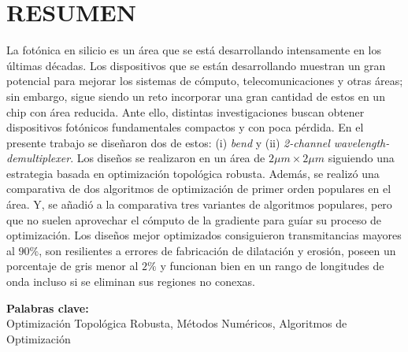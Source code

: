 \chapter*{\center \Large \vspace{-4.5cm} RESUMEN}

La fotónica en silicio es un área que se está desarrollando intensamente en los últimas décadas.
Los dispositivos que se están desarrollando muestran un gran potencial para mejorar
los sistemas de cómputo, telecomunicaciones y otras áreas;
sin embargo, sigue siendo un reto incorporar una gran cantidad de estos en un chip con área reducida.
Ante ello, distintas investigaciones buscan obtener dispositivos fotónicos fundamentales 
compactos y con poca pérdida. 
En el presente trabajo se diseñaron dos de estos: (i) \emph{bend} y (ii) \emph{2-channel wavelength-demultiplexer}.
Los diseños se realizaron en un área de $2 \mu m \times 2 \mu m$
siguiendo una estrategia basada en optimización topológica robusta.
Además, se realizó una comparativa de dos algoritmos de optimización de primer orden populares en el área.
Y, se añadió a la comparativa tres variantes de algoritmos populares, pero que no suelen
aprovechar el cómputo de la gradiente para guíar su proceso de optimización.
Los diseños mejor optimizados consiguieron transmitancias mayores al $90 \%$, son resilientes a errores
de fabricación de dilatación y erosión, poseen un porcentaje de gris menor al $2 \%$
y  funcionan bien en un rango de longitudes de onda incluso si se eliminan sus
regiones no conexas.

\noindent \textbf{Palabras clave:}\\
\noindent Optimización Topológica Robusta, Métodos Numéricos, Algoritmos de Optimización

